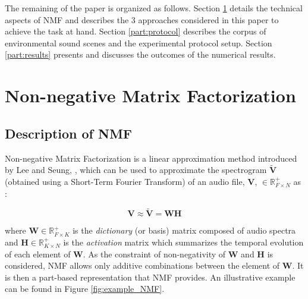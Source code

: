 \documentclass[twocolumn]{svjour3}          %
\begin{document}
The remaining of the paper is organized as follows. Section \ref{part:nmf} details the technical aspects of NMF and describes the 3 approaches considered in this paper to achieve the task at hand. Section \ref{part:protocol} describes the corpus of environmental sound scenes and the experimental protocol setup. Section \ref{part:results} presents and discusses the outcomes of the numerical results.

\section{Non-negative Matrix Factorization}\label{part:nmf}
\subsection{Description of NMF}

Non-negative Matrix Factorization is a linear approximation method introduced by Lee and Seung, \cite{lee_learning_1999}, which can be used to approximate the spectrogram $\mathbf{\tilde{V}}$ (obtained using a Short-Term Fourier Transform) of an audio file, $\mathbf{V}$, $\in \mathbb{R}^+_{F \times N}$ as :

\begin{equation}\label{eq:nmf}
\mathbf{V} \approx \mathbf{\tilde{V}} = \mathbf{WH}
\end{equation}

where $\mathbf{W} \in \mathbb{R}^+_{F \times K}$ is the \textit{dictionary} (or basis) matrix composed of audio spectra and $\mathbf{H} \in \mathbb{R}^+_{K \times N}$ is the \textit{activation} matrix which summarizes the temporal evolution of each element of $\mathbf{W}$. As the constraint of non-negativity of $\mathbf{W}$ and $\mathbf{H}$ is considered, NMF allows only additive combinations between the element of $\mathbf{W}$. It is then a part-based representation that NMF provides. An illustrative example can be found in Figure \ref{fig:example_NMF}.
\end{document}
